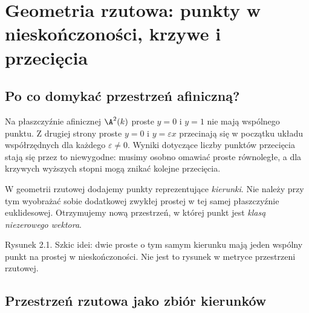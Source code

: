 \chapter{Geometria rzutowa: punkty w nieskończoności, krzywe i przecięcia}
\label{ch:rzutowa}

\providecommand{\atlasref}[2]{#2}


\section{Po co domykać przestrzeń afiniczną?}

Na płaszczyźnie afinicznej $\A^2(k)$ proste $y=0$ i $y=1$ nie
mają wspólnego punktu. Z drugiej strony proste $y=0$ i $y=\varepsilon x$
przecinają się w początku układu współrzędnych dla każdego
$\varepsilon\ne0$. Wyniki dotyczące liczby punktów przecięcia
stają się przez to niewygodne: musimy osobno omawiać proste równoległe,
a dla krzywych wyższych stopni mogą znikać kolejne przecięcia.

W geometrii rzutowej dodajemy punkty reprezentujące \emph{kierunki}.
Nie należy przy tym wyobrażać sobie dodatkowej zwykłej prostej
w tej samej płaszczyźnie euklidesowej. Otrzymujemy nową przestrzeń,
w której punkt jest \emph{klasą niezerowego wektora}.

\begin{center}

\small Rysunek 2.1. Szkic idei: dwie proste o tym samym kierunku mają
jeden wspólny punkt na prostej w nieskończoności. Nie jest to rysunek
w metryce przestrzeni rzutowej.
\end{center}

\section{Przestrzeń rzutowa jako zbiór kierunków}


